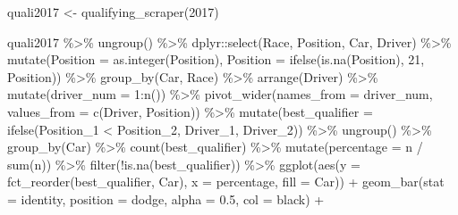 \documentclass[
]{book}
\newenvironment{Shaded}{\begin{snugshade}}{\end{snugshade}}
\newcommand{\AttributeTok}[1]{\textcolor[rgb]{0.77,0.63,0.00}{#1}}
\newcommand{\DecValTok}[1]{\textcolor[rgb]{0.00,0.00,0.81}{#1}}
\newcommand{\FloatTok}[1]{\textcolor[rgb]{0.00,0.00,0.81}{#1}}
\newcommand{\FunctionTok}[1]{\textcolor[rgb]{0.00,0.00,0.00}{#1}}
\newcommand{\NormalTok}[1]{#1}
\newcommand{\OtherTok}[1]{\textcolor[rgb]{0.56,0.35,0.01}{#1}}
\newcommand{\SpecialCharTok}[1]{\textcolor[rgb]{0.00,0.00,0.00}{#1}}
\newcommand{\StringTok}[1]{\textcolor[rgb]{0.31,0.60,0.02}{#1}}
\begin{document}
\begin{Shaded}
\begin{Highlighting}[]
\NormalTok{quali2017 }\OtherTok{\textless{}{-}} \FunctionTok{qualifying\_scraper}\NormalTok{(}\DecValTok{2017}\NormalTok{)}

\NormalTok{quali2017 }\SpecialCharTok{\%\textgreater{}\%}
  \FunctionTok{ungroup}\NormalTok{() }\SpecialCharTok{\%\textgreater{}\%}
\NormalTok{  dplyr}\SpecialCharTok{::}\FunctionTok{select}\NormalTok{(Race, Position, Car, Driver) }\SpecialCharTok{\%\textgreater{}\%}
  \FunctionTok{mutate}\NormalTok{(}\AttributeTok{Position =} \FunctionTok{as.integer}\NormalTok{(Position),}
         \AttributeTok{Position =} \FunctionTok{ifelse}\NormalTok{(}\FunctionTok{is.na}\NormalTok{(Position), }\DecValTok{21}\NormalTok{, Position)) }\SpecialCharTok{\%\textgreater{}\%} 
  \FunctionTok{group\_by}\NormalTok{(Car, Race) }\SpecialCharTok{\%\textgreater{}\%} 
  \FunctionTok{arrange}\NormalTok{(Driver) }\SpecialCharTok{\%\textgreater{}\%} 
  \FunctionTok{mutate}\NormalTok{(}\AttributeTok{driver\_num =} \DecValTok{1}\SpecialCharTok{:}\FunctionTok{n}\NormalTok{()) }\SpecialCharTok{\%\textgreater{}\%} 
  \FunctionTok{pivot\_wider}\NormalTok{(}\AttributeTok{names\_from =} \StringTok{\textquotesingle{}driver\_num\textquotesingle{}}\NormalTok{, }\AttributeTok{values\_from =} \FunctionTok{c}\NormalTok{(}\StringTok{\textquotesingle{}Driver\textquotesingle{}}\NormalTok{, }\StringTok{\textquotesingle{}Position\textquotesingle{}}\NormalTok{)) }\SpecialCharTok{\%\textgreater{}\%}
  \FunctionTok{mutate}\NormalTok{(}\AttributeTok{best\_qualifier =} \FunctionTok{ifelse}\NormalTok{(Position\_1 }\SpecialCharTok{\textless{}}\NormalTok{ Position\_2, Driver\_1, Driver\_2)) }\SpecialCharTok{\%\textgreater{}\%}
  \FunctionTok{ungroup}\NormalTok{() }\SpecialCharTok{\%\textgreater{}\%}
  \FunctionTok{group\_by}\NormalTok{(Car) }\SpecialCharTok{\%\textgreater{}\%}
  \FunctionTok{count}\NormalTok{(best\_qualifier) }\SpecialCharTok{\%\textgreater{}\%}
  \FunctionTok{mutate}\NormalTok{(}\AttributeTok{percentage =}\NormalTok{ n }\SpecialCharTok{/} \FunctionTok{sum}\NormalTok{(n)) }\SpecialCharTok{\%\textgreater{}\%}
  \FunctionTok{filter}\NormalTok{(}\SpecialCharTok{!}\FunctionTok{is.na}\NormalTok{(best\_qualifier)) }\SpecialCharTok{\%\textgreater{}\%}
  \FunctionTok{ggplot}\NormalTok{(}\FunctionTok{aes}\NormalTok{(}\AttributeTok{y =} \FunctionTok{fct\_reorder}\NormalTok{(best\_qualifier, Car), }\AttributeTok{x =}\NormalTok{ percentage, }\AttributeTok{fill =}\NormalTok{ Car)) }\SpecialCharTok{+}
  \FunctionTok{geom\_bar}\NormalTok{(}\AttributeTok{stat =} \StringTok{\textquotesingle{}identity\textquotesingle{}}\NormalTok{, }\AttributeTok{position =} \StringTok{\textquotesingle{}dodge\textquotesingle{}}\NormalTok{, }\AttributeTok{alpha =} \FloatTok{0.5}\NormalTok{, }\AttributeTok{col =} \StringTok{\textquotesingle{}black\textquotesingle{}}\NormalTok{) }\SpecialCharTok{+}

\end{Highlighting}
\end{Shaded}
\end{document}
